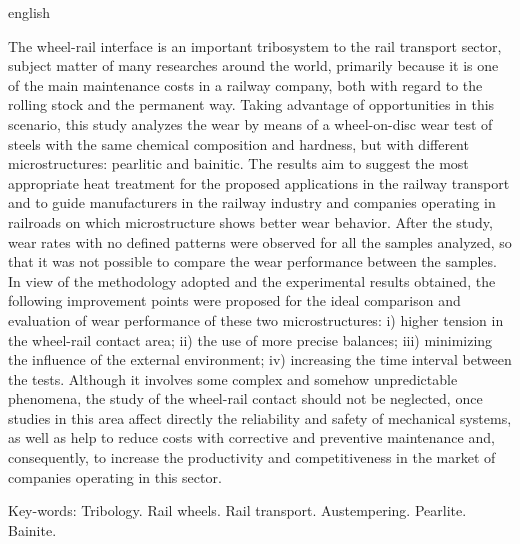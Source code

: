 \documentclass[
12pt,
openany, %
oneside, %
a4paper,			
english,			
brazil			        %
]{abntbibufjf}
\begin{document}
	
	\begin{resumo}[ABSTRACT]
		\begin{otherlanguage*}{english}
			
			The wheel-rail interface is an important tribosystem to the rail transport sector, subject matter of many researches around the world, primarily because it is one of the main maintenance costs in a railway company, both with regard to the rolling stock and the permanent way. Taking advantage of opportunities in this scenario, this study analyzes the wear by means of a wheel-on-disc wear test of steels with the same chemical composition and hardness, but with different microstructures: pearlitic and bainitic. The results aim to suggest the most appropriate heat treatment for the proposed applications in the railway transport and to guide manufacturers in the railway industry and companies operating in railroads on which microstructure shows better wear behavior. After the study, wear rates with no defined patterns were observed for all the samples analyzed, so that it was not possible to compare the wear performance between the samples. In view of the methodology adopted and the experimental results obtained, the following improvement points were proposed for the ideal comparison and evaluation of wear performance of these two microstructures: i) higher tension in the wheel-rail contact area; ii) the use of more precise balances; iii) minimizing the influence of the external environment; iv) increasing the time interval between the tests. Although it involves some complex and somehow unpredictable phenomena, the study of the wheel-rail contact should not be neglected, once studies in this area affect directly the reliability and safety of mechanical systems, as well as help to reduce costs with corrective and preventive maintenance and, consequently, to increase the productivity and competitiveness in the market of companies operating in this sector.
			
			Key-words: Tribology. Rail wheels. Rail transport. Austempering. Pearlite. Bainite.
		\end{otherlanguage*}
	\end{resumo}

	
	
	\listoffigures*
	\cleardoublepage
	
	
	\listoftables*
	\cleardoublepage
	
\end{document}

